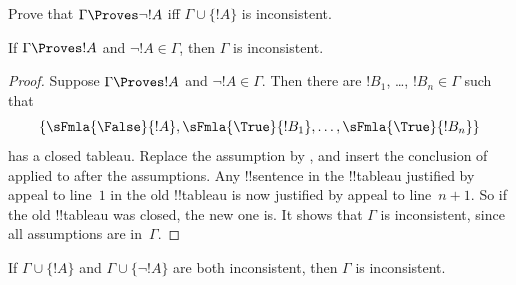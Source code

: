 \begin{prob}
Prove that $\Gamma \Proves \lnot !A$ iff $\Gamma \cup \{!A\}$ is inconsistent.
\end{prob}

\begin{prop}
  If $\Gamma \Proves !A$ and $\lnot !A \in \Gamma$, then $\Gamma$ is
  inconsistent.
\end{prop}

\begin{proof}
  Suppose $\Gamma \Proves !A$ and $\lnot !A \in \Gamma$.  Then there
  are $!B_1$, \dots, $!B_n \in \Gamma$ such that \
  \[
  \{\sFmla{\False}{!A}, \sFmla{\True}{!B_1}, \dots, \sFmla{\True}{!B_n}\}
  \]
  has a closed tableau. Replace the assumption  by
  \sFmla{\True}{\lnot !A}, and insert the conclusion of
  \TRule{\True}{\lnot} applied to \sFmla{\False}{!A} after the
  assumptions. Any !!{sentence} in the !!{tableau} justified by appeal
  to line~$1$ in the old !!{tableau} is now justified by appeal to
  line~$n+1$. So if the old !!{tableau} was closed, the new one is.
  It shows that $\Gamma$ is inconsistent, since all assumptions are
  in~$\Gamma$.
\end{proof}

\begin{prop}
  If $\Gamma \cup \{!A\}$ and $\Gamma \cup \{\lnot !A\}$ are both
  inconsistent, then $\Gamma$ is inconsistent.
\end{prop}

